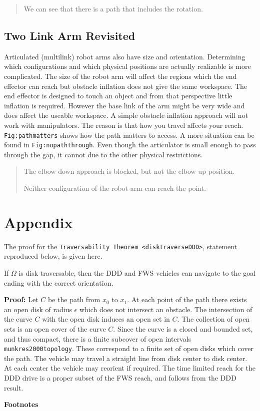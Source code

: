 \begin{quote}
We can see that there is a path that includes the rotation.
\end{quote}

\hypertarget{two-link-arm-revisited}{%
\subsection{Two Link Arm Revisited}\label{two-link-arm-revisited}}

Articulated (multilink) robot arms also have size and orientation.
Determining which configurations and which physical positions are
actually realizable is more complicated. The size of the robot arm will
affect the regions which the end effector can reach but obstacle
inflation does not give the same workspace. The end effector is designed
to touch an object and from that perspective little inflation is
required. However the base link of the arm might be very wide and does
affect the useable workspace. A simple obstacle inflation approach will
not work with manipulators. The reason is that how you travel affects
your reach. \texttt{Fig:pathmatters} shows how the path matters to
access. A more situation can be found in \texttt{Fig:nopaththrough}.
Even though the articulator is small enough to pass through the gap, it
cannot due to the other physical restrictions.

\begin{quote}
The elbow down approach is blocked, but not the elbow up position.

Neither configuration of the robot arm can reach the point.
\end{quote}

\hypertarget{appendix}{%
\section{Appendix}\label{appendix}}

The proof for the
\texttt{Traversability\ Theorem~\textless{}disktraverseDDD\textgreater{}},
statement reproduced below, is given here.

If \(\Omega\) is disk traversable, then the DDD and FWS vehicles can
navigate to the goal ending with the correct orientation.

\textbf{Proof:} Let \(C\) be the path from \(x_0\) to \(x_1\). At each
point of the path there exists an open disk of radius \(\epsilon\) which
does not intersect an obstacle. The intersection of the curve \(C\) with
the open disk induces an open set in \(C\). The collection of open sets
is an open cover of the curve \(C\). Since the curve is a closed and
bounded set, and thus compact, there is a finite subcover of open
intervals \texttt{munkres2000topology}. These correspond to a finite set
of open disks which cover the path. The vehicle may travel a straight
line from disk center to disk center. At each center the vehicle may
reorient if required. The time limited reach for the DDD drive is a
proper subset of the FWS reach, and follows from the DDD result.

\textbf{Footnotes}

